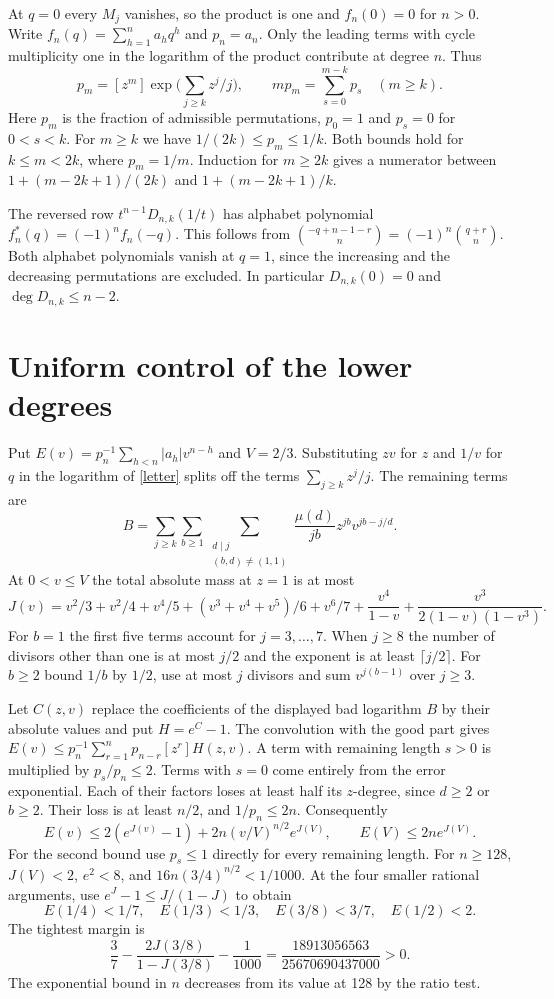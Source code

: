 \documentclass[11pt]{article}
\begin{document}
At $q=0$ every $M_j$ vanishes, so the product is one and $f_n(0)=0$ for $n>0$. Write $f_n(q)=\sum_{h=1}^n a_h q^h$ and $p_n=a_n$. Only the leading terms with cycle multiplicity one in the logarithm of the product contribute at degree $n$. Thus
\[
 p_m=[z^m]\exp\Big(\sum_{j\ge k}z^j/j\Big),\qquad
 m p_m=\sum_{s=0}^{m-k}p_s\quad(m\ge k).
\]
Here $p_m$ is the fraction of admissible permutations, $p_0=1$ and $p_s=0$ for $0<s<k$. For $m\ge k$ we have $1/(2k)\le p_m\le1/k$. Both bounds hold for $k\le m<2k$, where $p_m=1/m$. Induction for $m\ge2k$ gives a numerator between $1+(m-2k+1)/(2k)$ and $1+(m-2k+1)/k$.

The reversed row $t^{n-1}D_{n,k}(1/t)$ has alphabet polynomial $f_n^*(q)=(-1)^nf_n(-q)$. This follows from
$\binom{-q+n-1-r}{n}=(-1)^n\binom{q+r}{n}$. Both alphabet polynomials vanish at $q=1$, since the increasing and the decreasing permutations are excluded. In particular $D_{n,k}(0)=0$ and $\deg D_{n,k}\le n-2$.

\section{Uniform control of the lower degrees}
Put $E(v)=p_n^{-1}\sum_{h<n}|a_h|v^{n-h}$ and $V=2/3$. Substituting $zv$ for $z$ and $1/v$ for $q$ in the logarithm of \eqref{letter} splits off the terms $\sum_{j\ge k}z^j/j$. The remaining terms are
\[
 B=\sum_{j\ge k}\sum_{b\ge1}
 \sum_{\substack{d\mid j\\(b,d)\ne(1,1)}}
 \frac{\mu(d)}{jb}z^{jb}v^{jb-j/d}.
\]
At $0<v\le V$ the total absolute mass at $z=1$ is at most
\[
 J(v)=v^2/3+v^2/4+v^4/5+(v^3+v^4+v^5)/6+v^6/7
       +\frac{v^4}{1-v}+\frac{v^3}{2(1-v)(1-v^3)}.
\]
For $b=1$ the first five terms account for $j=3,\ldots,7$. When $j\ge8$ the number of divisors other than one is at most $j/2$ and the exponent is at least $\lceil j/2\rceil$. For $b\ge2$ bound $1/b$ by $1/2$, use at most $j$ divisors and sum $v^{j(b-1)}$ over $j\ge3$.

Let $C(z,v)$ replace the coefficients of the displayed bad logarithm $B$ by their absolute values and put $H=e^C-1$. The convolution with the good part gives $E(v)\le p_n^{-1}\sum_{r=1}^n p_{n-r}[z^r]H(z,v)$. A term with remaining length $s>0$ is multiplied by $p_s/p_n\le2$. Terms with $s=0$ come entirely from the error exponential. Each of their factors loses at least half its $z$-degree, since $d\ge2$ or $b\ge2$. Their loss is at least $n/2$, and $1/p_n\le2n$. Consequently
\[
 E(v)\le 2(e^{J(v)}-1)+2n(v/V)^{n/2}e^{J(V)},\qquad E(V)\le2n e^{J(V)}.
\]
For the second bound use $p_s\le1$ directly for every remaining length. For $n\ge128$, $J(V)<2$, $e^2<8$, and $16n(3/4)^{n/2}<1/1000$. At the four smaller rational arguments, use $e^J-1\le J/(1-J)$ to obtain
\begin{equation}\label{est}
 E(1/4)<1/7,\quad E(1/3)<1/3,\quad E(3/8)<3/7,\quad E(1/2)<2 .
\end{equation}
The tightest margin is \[ \frac37-\frac{2J(3/8)}{1-J(3/8)}-\frac1{1000} = \frac{18913056563}{25670690437000}>0. \] The exponential bound in $n$ decreases from its value at 128 by the ratio test.
\end{document}
